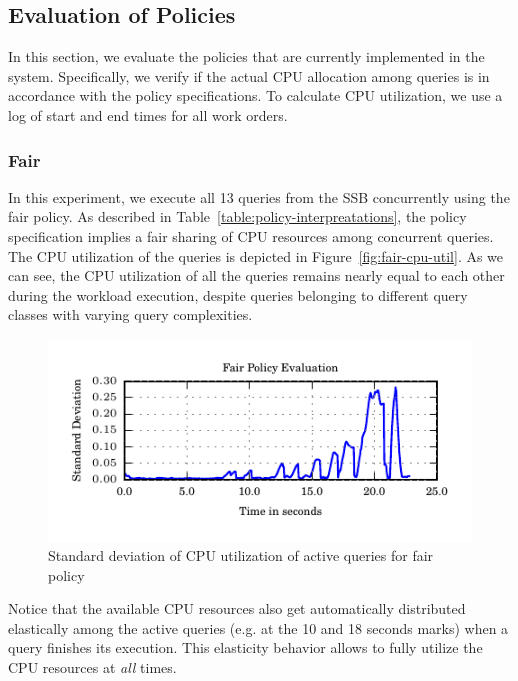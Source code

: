 \subsection{Evaluation of Policies}\label{ssec:policy-eval}
In this section, we evaluate the policies that are currently implemented in the system.
Specifically, we verify if the actual CPU allocation among queries is in accordance with the policy specifications.
To calculate CPU utilization, we use a log of start and end times for all work orders. %

\subsubsection{Fair}
In this experiment, we execute all 13 queries from the SSB concurrently using the fair policy. 
As described in Table~\ref{table:policy-interpreatations}, the policy specification implies a fair sharing of CPU resources among concurrent queries.
The CPU utilization of the queries is depicted in Figure~\ref{fig:fair-cpu-util}.
As we can see, the CPU utilization of all the queries remains nearly equal to each other during the workload execution, despite queries belonging to different query classes with varying query complexities.

\begin{figure}[ht]
	\centering
	\includegraphics[width=\columnwidth]{policy/figures/fair-stddev}
	\caption{Standard deviation of CPU utilization of active queries for fair policy}
	\label{fig:stddev-active-queries-fair}
\end{figure}

Notice that the available CPU resources also get automatically distributed elastically among the active queries (e.g. at the 10 and 18 seconds marks) when a query finishes its execution. 
This elasticity behavior allows \sys{} to fully utilize the CPU resources at \textit{all} times.

